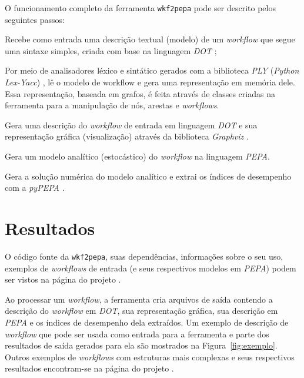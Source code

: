 \documentclass[a4paper,10pt]{article}
\begin{document}
        O funcionamento completo da ferramenta \texttt{wkf2pepa} pode ser descrito pelos seguintes passos:
        \begin{enumerate*}
            \item Recebe como entrada uma descrição textual (modelo) de um \emph{workflow} que segue uma sintaxe simples, criada com base na linguagem \emph{DOT} \cite{web:dot};
            \item Por meio de analisadores léxico e sintático gerados com a biblioteca \emph{PLY} (\emph{Python Lex-Yacc}) \cite{web:ply}, lê o modelo de workflow e gera uma representação em memória dele. Essa representação, baseada em grafos, é feita através de classes criadas na ferramenta para a manipulação de nós, arestas e \emph{workflows}.
            \item Gera uma descrição do \emph{workflow} de entrada em linguagem \emph{DOT} e sua representação gráfica (visualização) através da biblioteca \emph{Graphviz} \cite{web:graphviz}.
            \item Gera um modelo analítico (estocástico) do \emph{workflow} na linguagem \emph{PEPA}.
            \item Gera a solução numérica do modelo analítico e extrai os índices de desempenho com a  \emph{pyPEPA} .
        \end{enumerate*}


    \section*{Resultados}

    O código fonte da \texttt{wkf2pepa}, suas dependências, informações sobre o seu uso, exemplos de \emph{workflows} de entrada (e seus respectivos modelos em \emph{PEPA}) podem ser vistos na página do projeto \cite{web:script}.

    Ao processar um \emph{workflow}, a ferramenta cria arquivos de saída contendo a descrição do \emph{workflow} em \emph{DOT}, sua representação gráfica, sua descrição em \emph{PEPA} e os índices de desempenho dela extraídos. Um exemplo de descrição de \emph{workflow} que pode ser usada como entrada para a ferramenta e parte dos resultados de saída gerados para ela são mostrados  na Figura~\ref{fig:exemplo}. Outros exemplos de \emph{workflows} com estruturas mais complexas e seus respectivos resultados encontram-se na página do projeto \cite{web:script}.
\end{document}
